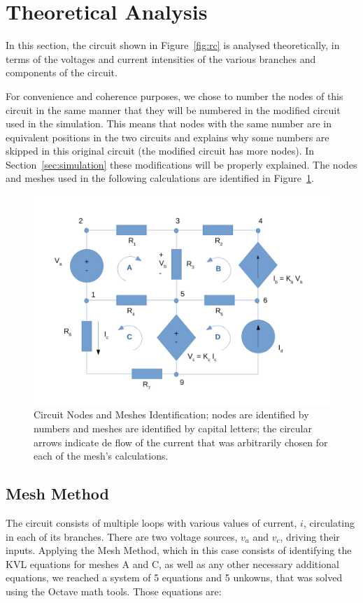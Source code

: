 \section{Theoretical Analysis}
\label{sec:analysis}

In this section, the circuit shown in Figure~\ref{fig:rc} is analysed
theoretically, in terms of the voltages and current intensities of the various branches and components of the circuit.

For convenience and coherence purposes, we chose to number the nodes of this circuit in the same manner that they will be numbered in the modified circuit used in the simulation. This means that nodes with the same number are in equivalent positions in the two circuits and explains why some numbers are skipped in this original circuit (the modified circuit has more nodes). In Section~\ref{sec:simulation} these modifications will be properly explained.
The nodes and meshes used in the following calculations are identified in Figure~\ref{fig:circuit_analysis}.

\begin{figure}[h] \centering
\includegraphics[width=0.8\linewidth]{circuit_analysis.pdf}
\caption{Circuit Nodes and Meshes Identification; nodes are identified by numbers and meshes are identified by capital letters; the circular arrows indicate de flow of the current that was arbitrarily chosen for each of the mesh's calculations.}
\label{fig:circuit_analysis}
\end{figure}


\subsection{Mesh Method}

The circuit consists of multiple loops with various values of current, $i$, circulating in each of its branches. There are two
voltage sources, $v_a$ and $v_c$, driving their inputs. Applying the Mesh Method, which in this case consists of identifying the KVL equations for meshes A and C, as well as any other necessary additional equations, we reached a system of 5 equations and 5 unkowns, that was solved using the Octave math tools. Those equations are:

